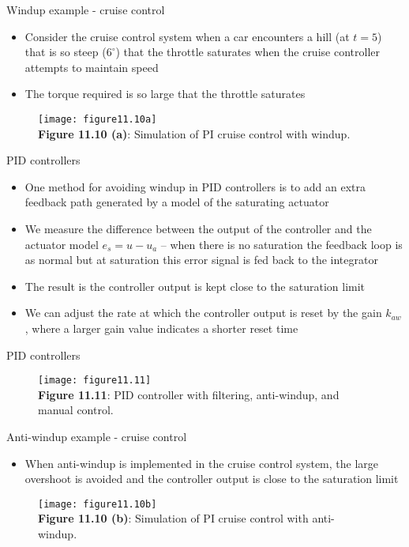 \documentclass{beamer-control}
\begin{document}
\begin{frame}{Windup example - cruise control}
\begin{itemize}
	\item Consider the cruise control system when a car encounters a hill (at $t=5$) that is so steep ($6^\circ$) that the throttle saturates when the cruise controller attempts to maintain speed
	\item The torque required is so large that the throttle saturates
\end{itemize}
\begin{figure}
	\centering
	\texttt{[image: figure11.10a]}
	\\
	\textbf{Figure 11.10 (a)}: Simulation of PI cruise control with windup.
\end{figure}

\end{frame}



\begin{frame}{PID controllers}
\begin{itemize}
\item One method for avoiding windup in PID controllers is to add an extra feedback path generated by a model of the saturating actuator
\item We measure the difference between the output of the controller and the actuator model $e_s=u-u_a$ -- when there is no saturation the feedback loop is as normal but at saturation this error signal is fed back to the integrator
\item The result is the controller output is kept close to the saturation limit
\item We can adjust the rate at which the controller output is reset by the gain $k_{aw}$, where a larger gain value indicates a shorter reset time
\end{itemize}
\end{frame}

\begin{frame}{PID controllers}
\begin{figure}
	\centering
	\texttt{[image: figure11.11]}
	\\
	\textbf{Figure 11.11}: PID controller with filtering, anti-windup, and manual control.
\end{figure}
\end{frame}

\begin{frame}{Anti-windup example - cruise control}
\begin{itemize}
	\item When anti-windup is implemented in the cruise control system, the large overshoot is avoided and the controller output is close to the saturation limit
\end{itemize}
\begin{figure}
	\centering
	\texttt{[image: figure11.10b]}
	\\
	\textbf{Figure 11.10 (b)}: Simulation of PI cruise control with anti-windup.
\end{figure}
\end{frame}
\end{document}
